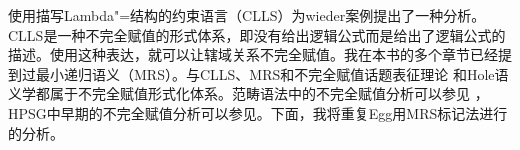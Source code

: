\citet{Egg99a}使用描写Lambda"=结构的约束语言（CLLS）为wieder案例提出了一种分析。CLLS是一种不完全赋值的形式体系，即没有给出逻辑公式而是给出了逻辑公式的描述。使用这种表达，就可以让辖域关系不完全赋值。我在本书的多个章节已经提到过最小递归语义（MRS）\indexmrsc\citep*{CFPS2005a}。与CLLS、MRS和不完全赋值话题表征理论  \citep{Reyle93b-u,FR95a-u}和Hole语义学\citep{Bos96a-u,BB2005a}都属于不完全赋值形式化体系。范畴语法\indexcgc 中的不完全赋值分析可以参见 ，HPSG\indexhpsgc 中早期的不完全赋值分析可以参见。下面，我将重复Egg用MRS标记法进行的分析。


